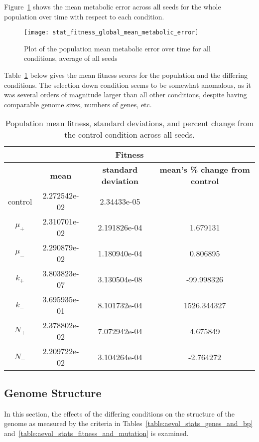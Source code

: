 Figure~\ref{fig:mean_metabolic_error} shows the mean metabolic error across all seeds for the whole population over time with respect to each condition. 
\begin{figure}[H]
	\texttt{[image: stat\_fitness\_global\_mean\_metabolic\_error]}
	\caption[Metabolic error]{Plot of the population mean metabolic error over time for all conditions, average of all seeds}
	\label{fig:mean_metabolic_error}
\end{figure}

Table~\ref{table:fitness_means_std_dev} below gives the mean fitness scores for the population and the differing conditions. The selection down condition seems to be somewhat anomalous, as it was several orders of magnitude larger than all other conditions, despite having comparable genome sizes, numbers of genes, etc.
\begin{table}[H]
	\centering
	\begin{tabular}{|c||c|c|c|}
		\hline
		\multicolumn{4}{c}{\Large \textbf{Fitness}} \\
		\hline
		& \textbf{mean} & \textbf{standard deviation} & \textbf{mean's \% change from control} \\
		\hline \hline
		control & 2.272542e-02 & 2.34433e-05 & \textemdash \\ 
		\hline
		$\mu_+$ & 2.310701e-02 & 2.191826e-04 & 1.679131 \\ 
		\hline
		$\mu_-$ & 2.290879e-02 & 1.180940e-04 & 0.806895 \\ 
		\hline
		$k_+$ & 3.803823e-07 & 3.130504e-08 & -99.998326 \\ 
		\hline
		$k_-$ & 3.695935e-01 & 8.101732e-04 & 1526.344327 \\ 
		\hline
		$N_+$ & 2.378802e-02 & 7.072942e-04 & 4.675849 \\ 
		\hline
		$N_-$ & 2.209722e-02 & 3.104264e-04 & -2.764272 \\ 
		\hline
	\end{tabular}
	\caption[Fitness means and standard deviations.]{Population mean fitness, standard deviations, and percent change from the control condition across all seeds. }
	\label{table:fitness_means_std_dev}
\end{table}

\subsection{Genome Structure}
In this section, the effects of the differing conditions on the structure of the genome as measured by the criteria in Tables~\ref{table:aevol_stats_genes_and_bp} and~\ref{table:aevol_stats_fitness_and_mutation} is examined. 

